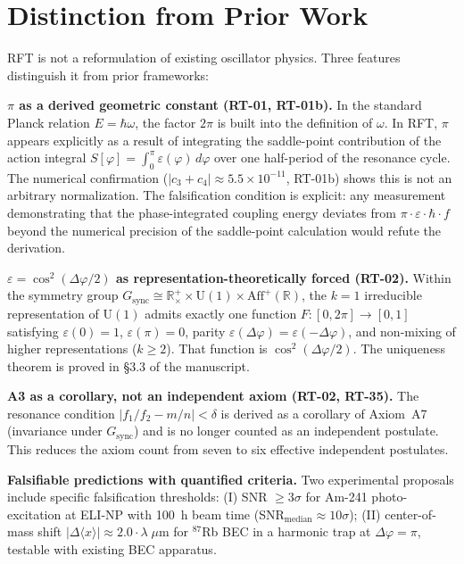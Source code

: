 \documentclass[12pt]{article}
\begin{document}
\section*{Distinction from Prior Work}

RFT is not a reformulation of existing oscillator physics. Three features distinguish
it from prior frameworks:

\textbf{$\pi$ as a derived geometric constant (RT-01, RT-01b).}
In the standard Planck relation $E = \hbar\omega$, the factor $2\pi$ is built into the
definition of $\omega$. In RFT, $\pi$ appears explicitly as a result of integrating the
saddle-point contribution of the action integral
$S[\varphi] = \int_0^{\pi} \varepsilon(\varphi)\,d\varphi$ over one half-period of the
resonance cycle. The numerical confirmation ($|c_3 + c_4| \approx 5.5 \times 10^{-11}$,
RT-01b) shows this is not an arbitrary normalization. The falsification condition is
explicit: any measurement demonstrating that the phase-integrated coupling energy
deviates from $\pi \cdot \varepsilon \cdot \hbar \cdot f$ beyond the numerical precision
of the saddle-point calculation would refute the derivation.

\textbf{$\varepsilon = \cos^2(\Delta\varphi/2)$ as representation-theoretically forced
(RT-02).}
Within the symmetry group
$G_{\mathrm{sync}} \cong \mathbb{R}^+_\times \times \mathrm{U}(1) \times
\mathrm{Aff}^+(\mathbb{R})$, the $k\!=\!1$ irreducible representation of $\mathrm{U}(1)$
admits exactly one function $F\colon[0,2\pi]\to[0,1]$ satisfying $\varepsilon(0)=1$,
$\varepsilon(\pi)=0$, parity $\varepsilon(\Delta\varphi)=\varepsilon(-\Delta\varphi)$,
and non-mixing of higher representations ($k \geq 2$). That function is
$\cos^2(\Delta\varphi/2)$. The uniqueness theorem is proved in \S3.3 of the manuscript.

\textbf{A3 as a corollary, not an independent axiom (RT-02, RT-35).}
The resonance condition $|f_1/f_2 - m/n| < \delta$ is derived as a corollary of
Axiom~A7 (invariance under $G_{\mathrm{sync}}$) and is no longer counted as an
independent postulate. This reduces the axiom count from seven to six effective
independent postulates.

\textbf{Falsifiable predictions with quantified criteria.}
Two experimental proposals include specific falsification thresholds: (I) SNR $\geq 3\sigma$
for Am-241 photo-excitation at ELI-NP with 100~h beam time
(SNR$_{\mathrm{median}} \approx 10\sigma$); (II) center-of-mass shift
$|\Delta\langle x\rangle| \approx 2.0\cdot\lambda\;\mu\mathrm{m}$ for ${}^{87}$Rb BEC
in a harmonic trap at $\Delta\varphi = \pi$, testable with existing BEC apparatus.
\end{document}
